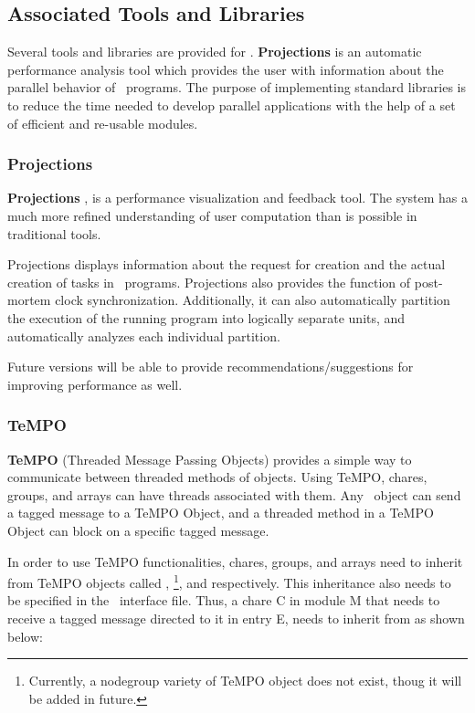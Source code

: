 \subsection{Associated Tools and Libraries}

Several tools and libraries are provided for \charmpp. {\bf
Projections} is an automatic performance analysis tool which provides
the user with information about the parallel behavior of \charmpp\ programs. The purpose of implementing \charmpp standard
libraries is to reduce the time needed to develop parallel
applications with the help of a set of efficient and re-usable modules.

\subsubsection{Projections}
{\bf Projections} \cite{ProjectionsIPPS93}, \cite{Projections} is a
performance visualization and feedback tool. The system has a much
more refined understanding of user computation than is possible in
traditional tools.

Projections displays information about the request for creation and
the actual creation of tasks in \charmpp\ programs. Projections also
provides the function of post-mortem clock
synchronization. Additionally, it can also automatically partition
the execution of the running program into logically separate units,
and automatically analyzes each individual partition. 

Future versions will be able to provide recommendations/suggestions
for improving performance as well.

\subsubsection{TeMPO}

{\bf TeMPO} (Threaded Message Passing Objects) provides a simple way
to communicate between threaded methods of objects. Using TeMPO,
chares, groups, and arrays can have threads associated with
them. Any \charmpp\ object can send a tagged message to a TeMPO Object,
and a threaded method in a TeMPO Object can block on a specific tagged
message.

In order to use TeMPO functionalities, chares, groups, and arrays need
to inherit from TeMPO objects called , \footnote{
Currently, a nodegroup variety of TeMPO object does not exist, thoug it will
be added in future.},
and  respectively. This inheritance also needs to be
specified in the \charmpp\ interface file. Thus, a chare C in module M
that needs to receive a tagged message directed to it in entry E, 
needs to inherit from  as shown below:


